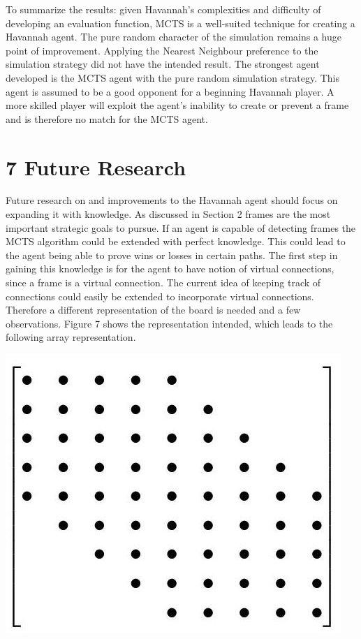 \documentclass[10pt]{article}
\begin{document}
To summarize the results: given Havannah's complexities and difficulty of developing an evaluation function, MCTS is a well-suited technique for creating a Havannah agent. The pure random character of the simulation remains a huge point of improvement. Applying the Nearest Neighbour preference to the simulation strategy did not have the intended result. The strongest agent developed is the MCTS agent with the pure random simulation strategy. This agent is assumed to be a good opponent for a beginning Havannah player. A more skilled player will exploit the agent's inability to create or prevent a frame and is therefore no match for the MCTS agent.

\section*{7 Future Research}
Future research on and improvements to the Havannah agent should focus on expanding it with knowledge. As discussed in Section 2 frames are the most important strategic goals to pursue. If an agent is capable of detecting frames the MCTS algorithm could be extended with perfect knowledge. This could lead to the agent being able to prove wins or losses in certain paths. The first step in gaining this knowledge is for the agent to have notion of virtual connections, since a frame is a virtual connection. The current idea of keeping track of connections could easily be extended to incorporate virtual connections. Therefore a different representation of the board is needed and a few observations. Figure 7 shows the representation intended, which leads to the following array representation.

\begin{center}
\includegraphics[max width=\textwidth]{2024_09_21_575efd6e0a8f951a52dfg-7}
\end{center}
\end{document}
